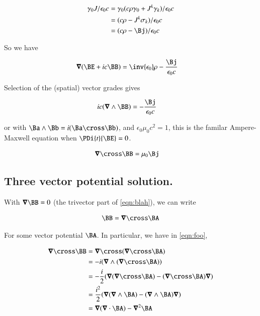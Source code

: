 \documentclass{article}
\begin{document}
\begin{align*}
\gamma_0 J/\epsilon_0 c 
&=
\gamma_0 (c \rho \gamma_0 + J^k \gamma_k)/\epsilon_0 c  \\
&=
(c \rho - J^k \sigma_k)/\epsilon_0 c  \\
&=
(c \rho - \Bj)/\epsilon_0 c  \\
\end{align*}

So we have

\begin{align}\label{eqn:blah}
\spacegrad (\BE + i c \BB) 
&=
\inv{\epsilon_0}\rho - \frac{\Bj}{\epsilon_0 c} 
\end{align}

Selection of the (spatial) vector grades gives

\begin{align*}
i c (\spacegrad \wedge \BB) &= - \frac{\Bj}{\epsilon_0 c} 
\end{align*}

or with $\Ba \wedge \Bb = i (\Ba \cross \Bb)$, and $\epsilon_0 \mu_0 c^2 = 1$, this is the familar Ampere-Maxwell equation when $\PDi{t}{\BE} = 0$.

\begin{align}\label{eqn:foo}
\spacegrad \cross \BB &= \mu_0 \Bj
\end{align}

\subsection{ Three vector potential solution. }

With $\spacegrad \BB = 0$ (the trivector part of \ref{eqn:blah}), we can write

\begin{align*}
\BB = \spacegrad \cross \BA 
\end{align*}

For some vector potential $\BA$.  In particular, we have in \ref{eqn:foo}, 

\begin{align*}
\spacegrad \cross \BB
&=
\spacegrad \cross (\spacegrad \cross \BA) \\
&=
-i (\spacegrad \wedge (\spacegrad \cross \BA) ) \\
&=
-\frac{i}{2} (
\spacegrad (\spacegrad \cross \BA) 
- (\spacegrad \cross \BA) \spacegrad 
) \\
&=
\frac{i^2}{2} (
\spacegrad (\spacegrad \wedge \BA) 
- (\spacegrad \wedge \BA) \spacegrad 
) \\
&= \spacegrad (\spacegrad \cdot \BA) - \spacegrad^2 \BA 
\end{align*}





\end{document}
